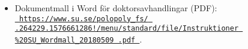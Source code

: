 \begin{itemize}
\item Dokumentmall i Word för doktorsavhandlingar (PDF):
  \\\href{%
    https://www.su.se/polopoly\_fs/1.264229.1576661286!/menu/standard/%
    file/Instruktioner\%20SU\_Wordmall\_20180509.pdf%
  }{\texttt{%
      https://\linebreak[0]www.su.se/\linebreak[0]polopoly\_fs/%
      \linebreak[0].264229\linebreak[0].1576661286\linebreak[0]!/\linebreak[0]%
      menu/\linebreak[0]standard/\linebreak[0]file/\linebreak[0]Instruktioner%
      \linebreak[0]\%20SU\linebreak[0]\_Wordmall\linebreak[0]\_20180509%
      \linebreak[0].pdf%
  }}.
\end{itemize}






